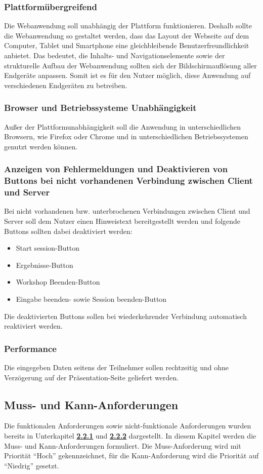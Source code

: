 \subsubsection*{Plattformübergreifend}
Die Webanwendung soll unabhängig der Plattform funktionieren. Deshalb sollte die Webanwendung so gestaltet werden, dass das Layout der Webseite auf dem Computer, Tablet und Smartphone eine gleichbleibende Benutzerfreundlichkeit anbietet. Das bedeutet, die Inhalts- und Navigationselemente sowie der strukturelle Aufbau der Webanwendung sollten sich der Bildschirmauflösung aller Endgeräte anpassen. Somit ist es für den Nutzer möglich, diese Anwendung auf verschiedenen Endgeräten zu betreiben.

\subsubsection*{Browser und Betriebssysteme Unabhängigkeit}
Außer der Plattformunabhängigkeit soll die Anwendung in unterschiedlichen Browsern, wie Firefox oder Chrome und in unterschiedlichen Betriebssystemen genutzt werden können.

\subsubsection*{Anzeigen von Fehlermeldungen und Deaktivieren von Buttons bei nicht vorhandenen Verbindung zwischen Client und Server}
Bei nicht vorhandenen bzw. unterbrochenen Verbindungen zwischen Client und Server soll dem Nutzer einen Hinweistext bereitgestellt werden und folgende Buttons sollten dabei deaktiviert werden:
\begin{itemize}
\item Start session-Button
\item Ergebnisse-Button
\item Workshop Beenden-Button
\item Eingabe beenden- sowie Session beenden-Button
\end{itemize}
Die deaktivierten Buttons sollen bei wiederkehrender Verbindung automatisch reaktiviert werden.

\subsubsection*{Performance}
Die eingegeben Daten seitens der Teilnehmer sollen rechtzeitig und ohne Verzögerung auf der Präsentation-Seite geliefert werden.

\subsection{Muss- und Kann-Anforderungen}
Die funktionalen Anforderungen sowie nicht-funktionale Anforderungen wurden bereits in Unterkapitel \hyperref[sec:funktionale anforderungen]{\textbf{2.2.1}} und \hyperref[sec:nicht-funktionale anforderungen]{\textbf{2.2.2}} dargestellt. In diesem Kapitel werden die Muss- und Kann-Anforderungen formuliert. Die Muss-Anforderung wird mit Priorität “Hoch” gekennzeichnet, für die Kann-Anforderung wird die Priorität auf “Niedrig” gesetzt.\\


